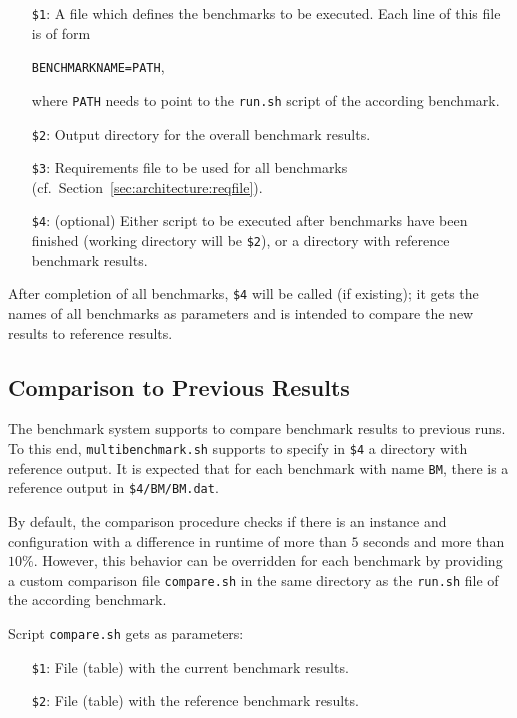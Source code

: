 \documentclass[a4paper]{article}
\begin{document}
			\medskip{}
			\begin{itemize}
				\item[{\tt \$1}:] A file which defines the benchmarks to be executed.
					Each line of this file is of form
					\begin{center}
						{\tt BENCHMARKNAME=PATH},
					\end{center}
					where {\tt PATH} needs to point to the {\tt run.sh} script of the according benchmark.
				\item[{\tt \$2}:] Output directory for the overall benchmark results.
				\item[{\tt \$3}:] Requirements file to be used for all benchmarks (cf.~Section~\ref{sec:architecture:reqfile}).
				\item[{\tt \$4}:] (optional) Either script to be executed after benchmarks have been finished (working directory will be {\tt \$2}),
				    or a directory with reference benchmark results.
			\end{itemize}
			
			After completion of all benchmarks, {\tt \$4} will be called (if existing); it gets the names of all benchmarks as parameters
			and is intended to compare the new results to reference results.
					
		\subsection{Comparison to Previous Results}
					
			The benchmark system supports to compare benchmark results
			to previous runs.
			To this end, {\tt multibenchmark.sh}
			supports to specify in {\tt \$4} a directory with reference output.
			It is expected that for each benchmark with name {\tt BM},
			there is a reference output in {\tt \$4/BM/BM.dat}.
			
			By default, the comparison procedure checks if there is an
			instance and configuration with a difference in runtime of more than $5$ seconds and more than $10\%$.
			However, this behavior can be overridden for each benchmark
			by providing a custom comparison file {\tt compare.sh}
			in the same directory as the {\tt run.sh} file of the according benchmark.
			
			Script {\tt compare.sh} gets as parameters:
			    \begin{itemize}
					\item[{\tt \$1}:] File (table) with the current benchmark results.
					\item[{\tt \$2}:] File (table) with the reference benchmark results.
			    \end{itemize}
			
\end{document}
